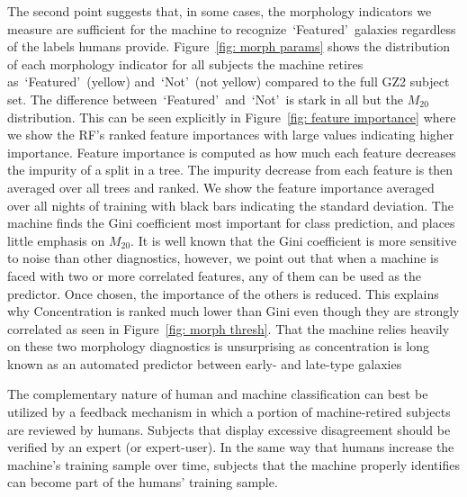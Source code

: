 \documentclass[twocolumn]{aastex6}
\newcommand{\M}[1]{$M_{\mathrm{#1}}$}
\newcommand{\feat}{`Featured'}
\newcommand{\notfeat}{`Not'}
\begin{document}
The second point suggests that, in some cases, the morphology indicators we measure are 
sufficient for the machine to recognize~\feat~galaxies regardless of the labels humans provide. 
Figure~\ref{fig: morph params} shows the distribution of each 
morphology indicator for all subjects the machine retires as~\feat~(yellow) 
and~\notfeat~(not yellow) compared to the full GZ2 subject set. 
The difference between~\feat~and~\notfeat~is stark in all but the \M{20} distribution. 
This can be seen explicitly in Figure~\ref{fig:  feature importance} where
we show the RF's ranked feature importances with large values indicating higher importance. 
Feature importance is computed as how much each feature decreases the impurity 
of a split in a tree. The impurity decrease from each feature is then averaged over
all trees and ranked. 
We show the feature importance averaged over all nights of training with 
black bars indicating the standard deviation. The machine finds the Gini coefficient 
most important for class prediction, and places little emphasis on \M{20}. 
It is well known that the Gini coefficient is more sensitive to noise than other diagnostics, 
however, we point out that when a machine is faced with two or more correlated features, 
any of them can be used as the predictor. Once chosen, the importance of the others is reduced. 
This explains why Concentration is ranked much lower than Gini even though they 
are strongly correlated as seen in Figure~\ref{fig: morph thresh}. 
That the machine relies heavily on these two morphology diagnostics is unsurprising as
concentration is long known as an automated predictor between early- and late-type galaxies~\citep{Abraham1994, Abraham1996, Shen2003}


The complementary nature of human and machine classification can 
best be utilized by a feedback mechanism in which a portion of machine-retired
subjects are reviewed by humans. Subjects that display excessive disagreement
should be verified by an expert (or expert-user).  In the same way that 
humans increase the machine's training sample over time, subjects that the
machine properly identifies can become part of the humans' training sample. 



\end{document}
